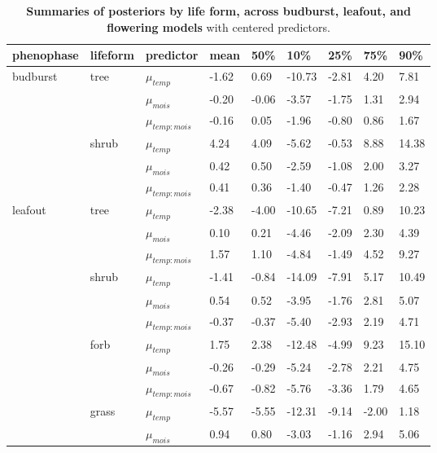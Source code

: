 \documentclass{article}
\begin{document}
\begin{table}[ht]
\centering
\caption{\textbf{Summaries of posteriors by life form, across budburst, leafout, and flowering models} with centered predictors.} 
\label{tab:lifeform}
\begingroup\footnotesize
\begin{tabular}{|p{}|p{}|p{}|p{}p{}p{}p{}p{}p{}|}
  \hline
phenophase & lifeform & predictor & mean & 50\% & 10\% & 25\% & 75\% & 90\% \\ 
  \hline
budburst & tree & $\mu_{temp}$ & -1.62 & 0.69 & -10.73 & -2.81 & 4.20 & 7.81 \\ 
   &  & $\mu_{mois}$ & -0.20 & -0.06 & -3.57 & -1.75 & 1.31 & 2.94 \\ 
   &  & $\mu_{temp:mois}$ & -0.16 & 0.05 & -1.96 & -0.80 & 0.86 & 1.67 \\ 
   & shrub & $\mu_{temp}$ & 4.24 & 4.09 & -5.62 & -0.53 & 8.88 & 14.38 \\ 
   &  & $\mu_{mois}$ & 0.42 & 0.50 & -2.59 & -1.08 & 2.00 & 3.27 \\ 
   &  & $\mu_{temp:mois}$ & 0.41 & 0.36 & -1.40 & -0.47 & 1.26 & 2.28 \\ 
   \hline
leafout & tree & $\mu_{temp}$ & -2.38 & -4.00 & -10.65 & -7.21 & 0.89 & 10.23 \\ 
   &  & $\mu_{mois}$ & 0.10 & 0.21 & -4.46 & -2.09 & 2.30 & 4.39 \\ 
   &  & $\mu_{temp:mois}$ & 1.57 & 1.10 & -4.84 & -1.49 & 4.52 & 9.27 \\ 
   & shrub & $\mu_{temp}$ & -1.41 & -0.84 & -14.09 & -7.91 & 5.17 & 10.49 \\ 
   &  & $\mu_{mois}$ & 0.54 & 0.52 & -3.95 & -1.76 & 2.81 & 5.07 \\ 
   &  & $\mu_{temp:mois}$ & -0.37 & -0.37 & -5.40 & -2.93 & 2.19 & 4.71 \\ 
   & forb & $\mu_{temp}$ & 1.75 & 2.38 & -12.48 & -4.99 & 9.23 & 15.10 \\ 
   &  & $\mu_{mois}$ & -0.26 & -0.29 & -5.24 & -2.78 & 2.21 & 4.75 \\ 
   &  & $\mu_{temp:mois}$ & -0.67 & -0.82 & -5.76 & -3.36 & 1.79 & 4.65 \\ 
   & grass & $\mu_{temp}$ & -5.57 & -5.55 & -12.31 & -9.14 & -2.00 & 1.18 \\ 
   &  & $\mu_{mois}$ & 0.94 & 0.80 & -3.03 & -1.16 & 2.94 & 5.06 \\ 

\end{tabular}
\end{table}
\end{document}
